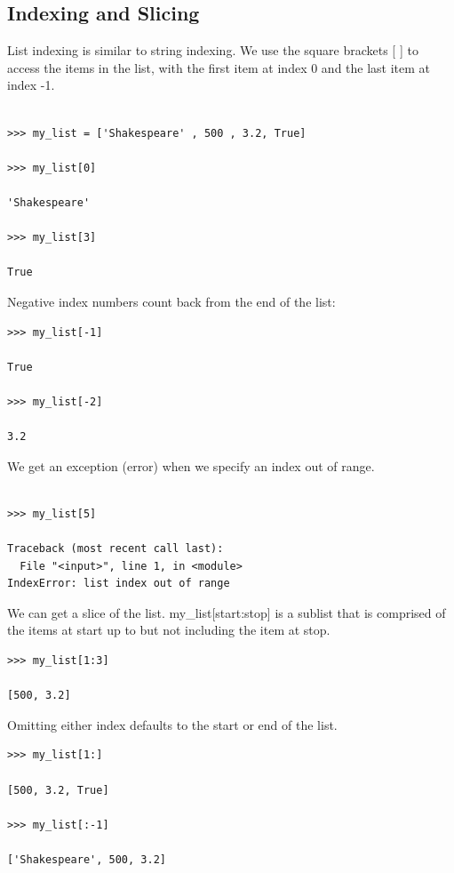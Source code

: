 \documentclass{article}
\begin{document}
\subsection{Indexing and Slicing}

List indexing is similar to string indexing.  We use the square brackets [ ] to access the items in the list, with the first item at index 0 and the last item at index -1.

\begin{lstlisting}

>>> my_list = ['Shakespeare' , 500 , 3.2, True]

>>> my_list[0]

'Shakespeare'

>>> my_list[3]

True

\end{lstlisting}

Negative index numbers count back from the end of the list:

\begin{lstlisting}
>>> my_list[-1]

True

>>> my_list[-2]

3.2

\end{lstlisting}

We get an exception (error) when we specify an index out of range.

\begin{lstlisting}

>>> my_list[5]

Traceback (most recent call last):
  File "<input>", line 1, in <module>
IndexError: list index out of range

\end{lstlisting}

We can get a slice of the list.  my{\_}list[start:stop] is a sublist that is comprised of  the items at start up to but not including the item at stop.  

\begin{lstlisting}
>>> my_list[1:3]

[500, 3.2]

\end{lstlisting}

Omitting either index defaults to the start or end of the list.

\begin{lstlisting}
>>> my_list[1:]

[500, 3.2, True]

>>> my_list[:-1]

['Shakespeare', 500, 3.2]

\end{lstlisting}
\end{document}
